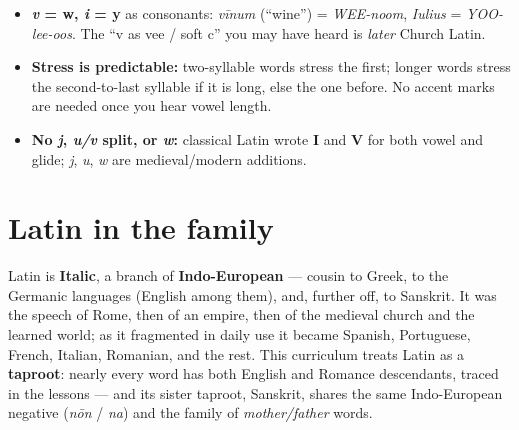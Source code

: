 \begin{itemize}
\raggedright
\setlength{\itemsep}{0.35em}
  \item \textbf{\emph{v} = w, \emph{i} = y} as consonants: \emph{vīnum} (\textquotedblleft{}wine\textquotedblright{}) = \emph{WEE-noom}, \emph{Iulius} = \emph{YOO-lee-oos}. The \textquotedblleft{}v as vee / soft c\textquotedblright{} you may have heard is \emph{later} Church Latin.
  \item \textbf{Stress is predictable:} two-syllable words stress the first; longer words stress the second-to-last syllable if it is long, else the one before. No accent marks are needed once you hear vowel length.
  \item \textbf{No \emph{j}, \emph{u/v} split, or \emph{w}:} classical Latin wrote \textbf{I} and \textbf{V} for both vowel and glide; \emph{j}, \emph{u}, \emph{w} are medieval/modern additions.
\end{itemize}

\section*{Latin in the family}

Latin is \textbf{Italic}, a branch of \textbf{Indo-European} — cousin to Greek, to the Germanic languages (English among them), and, further off, to Sanskrit. It was the speech of Rome, then of an empire, then of the medieval church and the learned world; as it fragmented in daily use it became Spanish, Portuguese, French, Italian, Romanian, and the rest. This curriculum treats Latin as a \textbf{taproot}: nearly every word has both English and Romance descendants, traced in the lessons — and its sister taproot, Sanskrit, shares the same Indo-European negative (\emph{nōn} / \emph{na}) and the family of \emph{mother/father} words.
